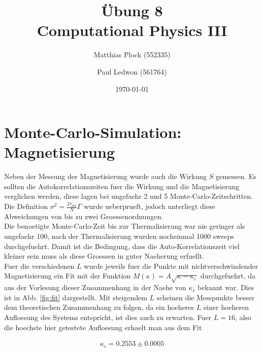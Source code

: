 \documentclass[10pt,a4paper]{article}
\title{Übung 8 \\Computational Physics III}
\author{Matthias Plock (552335) \and Paul Ledwon (561764)} %
\date{\today}
\begin{document}
\maketitle
\tableofcontents

\pagestyle{myheadings}                  %

\section{Monte-Carlo-Simulation: Magnetisierung}

Neben der Messung der Magnetisierung wurde auch die Wirkung $S$ gemessen. Es sollten die
Autokorrelationszeiten fuer die Wirkung und die Magnetisierung verglichen werden, diese lagen bei ungefaehr 2 und 5 Monte-Carlo-Zeitschritten.\\

Die Definition $\sigma^2 = \frac{2\tau_{int}}{N}\Gamma$ wurde ueberprueft, jedoch unterliegt diese Abweichungen von bis zu zwei Groessenordnungen.\\

Die benoetigte Monte-Carlo-Zeit bis zur Thermalisierung war nie geringer als ungefaehr 100, nach der Thermalisierung wurden nocheinmal 1000 sweeps durchgefuehrt. Damit ist die Bedingung, dass die Auto-Korrelationszeit viel kleiner sein muss als diese Groessen in guter Naeherung erfuellt.\\

Fuer die verschiedenen $L$ wurde jeweils fuer die Punkte mit nichtverschwindender Magnetisierung
ein Fit mit der Funktion $M(\kappa)=A\sqrt{\kappa - \kappa_c}$ durchgefuehrt, da aus der
Vorlesung dieser Zusammenhang in der Naehe von $\kappa_c$ bekannt war. Dies ist in Abb. \ref{fig:fit}
dargestellt. Mit steigendem $L$ scheinen die Messpunkte besser dem theoretischen Zusammenhang zu folgen, da ein hoeheres $L$ einer hoeheren Aufloesung des Systems entspricht, ist dies auch zu erwarten.
Fuer $L=16$, also die hoechste hier getestete Aufloesung erhaelt man aus dem Fit

\begin{align*}
    \kappa_c = 0.2553 \pm 0.0005
\end{align*}
\end{document}
